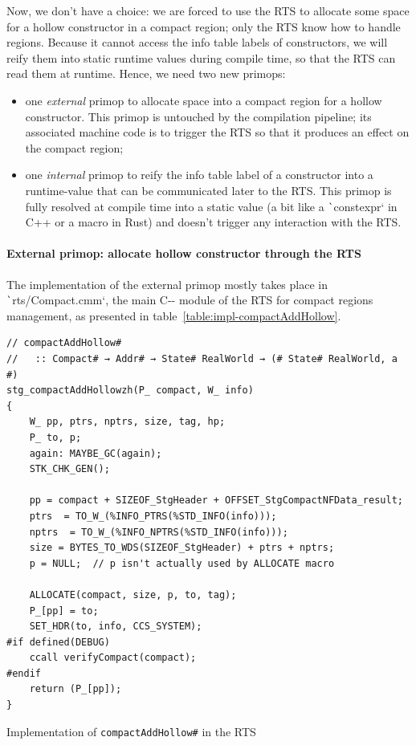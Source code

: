 \documentclass[english]{jflart}
\begin{document}
Now, we don't have a choice: we are forced to use the RTS to allocate some space for a hollow constructor in a compact region; only the RTS know how to handle regions. Because it cannot access the info table labels of constructors, we will reify them into static runtime values during compile time, so that the RTS can read them at runtime. Hence, we need two new primops:

\begin{itemize}
\item one \emph{external} primop to allocate space into a compact region for a hollow constructor. This primop is untouched by the compilation pipeline; its associated machine code is to trigger the RTS so that it produces an effect on the compact region;
\item one \emph{internal} primop to reify the info table label of a constructor into a runtime-value that can be communicated later to the RTS. This primop is fully resolved at compile time into a static value (a bit like a \texttt`constexpr` in C++ or a macro in Rust) and doesn't trigger any interaction with the RTS.
\end{itemize}

\paragraph{External primop: allocate hollow constructor through the RTS}

The implementation of the external primop mostly takes place in \texttt`rts/Compact.cmm`, the main C-{}- module of the RTS for compact regions management, as presented in table~\ref{table:impl-compactAddHollow}.

\begin{table}[t]
\small
\begin{verbatim}
// compactAddHollow#
//   :: Compact# → Addr# → State# RealWorld → (# State# RealWorld, a #)
stg_compactAddHollowzh(P_ compact, W_ info)
{
    W_ pp, ptrs, nptrs, size, tag, hp;
    P_ to, p;
    again: MAYBE_GC(again);
    STK_CHK_GEN();

    pp = compact + SIZEOF_StgHeader + OFFSET_StgCompactNFData_result;
    ptrs  = TO_W_(%INFO_PTRS(%STD_INFO(info)));
    nptrs  = TO_W_(%INFO_NPTRS(%STD_INFO(info)));
    size = BYTES_TO_WDS(SIZEOF_StgHeader) + ptrs + nptrs;
    p = NULL;  // p isn't actually used by ALLOCATE macro

    ALLOCATE(compact, size, p, to, tag);
    P_[pp] = to;
    SET_HDR(to, info, CCS_SYSTEM);
#if defined(DEBUG)
    ccall verifyCompact(compact);
#endif
    return (P_[pp]);
}
\end{verbatim}
\caption{Implementation of \texttt{compactAddHollow\#} in the RTS}
\label{table:impl-compactAddHollow}
\end{table}
\end{document}
